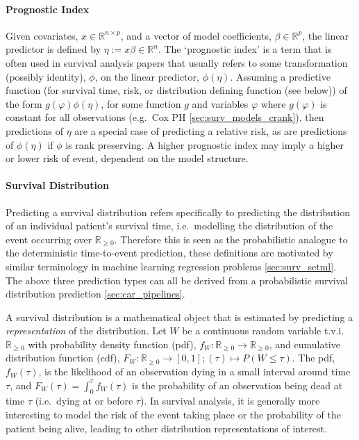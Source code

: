\documentclass[
  letterpaper,
]{scrbook}
\let\oldparagraph\paragraph
\renewcommand{\paragraph}[1]{\oldparagraph{#1}\mbox{}}
\theoremstyle{plain}
\theoremstyle{definition}
\theoremstyle{remark}
\begin{document}
\paragraph{Prognostic Index}

Given covariates, \(x \in \mathbb{R}^{n \times p}\), and a vector of
model coefficients, \(\beta \in \mathbb{R}^p\), the linear predictor is
defined by \(\eta := x\beta \in \mathbb{R}^n\). The `prognostic index'
is a term that is often used in survival analysis papers that usually
refers to some transformation (possibly identity), \(\phi\), on the
linear predictor, \(\phi(\eta)\). Assuming a predictive function (for
survival time, risk, or distribution defining function (see below)) of
the form \(g(\varphi)\phi(\eta)\), for some function \(g\) and variables
\(\varphi\) where \(g(\varphi)\) is constant for all observations
(e.g.~Cox PH \ref{sec:surv_models_crank}), then predictions of \(\eta\)
are a special case of predicting a relative risk, as are predictions of
\(\phi(\eta)\) if \(\phi\) is rank preserving. A higher prognostic index
may imply a higher or lower risk of event, dependent on the model
structure.

\paragraph{Survival Distribution}

Predicting a survival distribution refers specifically to predicting the
distribution of an individual patient's survival time, i.e.~modelling
the distribution of the event occurring over \(\mathbb{R}_{\geq 0}\).
Therefore this is seen as the probabilistic analogue to the
deterministic time-to-event prediction, these definitions are motivated
by similar terminology in machine learning regression problems
\ref{sec:surv_setml}. The above three prediction types can all be
derived from a probabilistic survival distribution prediction
\ref{sec:car_pipelines}.

A survival distribution is a mathematical object that is estimated by
predicting a \emph{representation} of the distribution. Let \(W\) be a
continuous random variable t.v.i. \(\mathbb{R}_{\geq 0}\) with
probability density function (pdf),
\(f_W: \mathbb{R}_{\geq 0}\rightarrow \mathbb{R}_{\geq 0}\), and
cumulative distribution function (cdf),
\(F_W: \mathbb{R}_{\geq 0}\rightarrow [0,1]; (\tau) \mapsto P(W \leq \tau)\).
The pdf, \(f_W(\tau)\), is the likelihood of an observation dying in a
small interval around time \(\tau\), and
\(F_W(\tau) = \int^\tau_0 f_W(\tau)\) is the probability of an
observation being dead at time \(\tau\) (i.e.~dying at or before
\(\tau\)). In survival analysis, it is generally more interesting to
model the risk of the event taking place or the probability of the
patient being alive, leading to other distribution representations of
interest.
\end{document}
